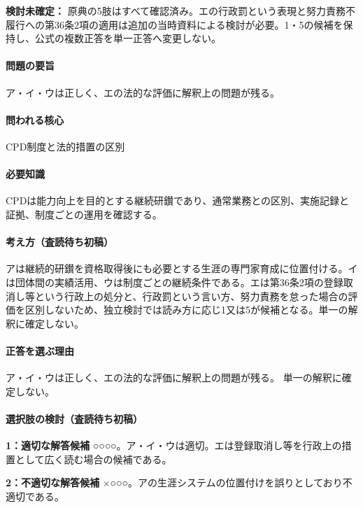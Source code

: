 \par\textbf{検討未確定：} 原典の5肢はすべて確認済み。エの行政罰という表現と努力責務不履行への第36条2項の適用は追加の当時資料による検討が必要。1・5の候補を保持し、公式の複数正答を単一正答へ変更しない。

\paragraph{問題の要旨} ア・イ・ウは正しく、エの法的な評価に解釈上の問題が残る。

\paragraph{問われる核心} CPD制度と法的措置の区別

\paragraph{必要知識} CPDは能力向上を目的とする継続研鑚であり、通常業務との区別、実施記録と証拠、制度ごとの運用を確認する。

\paragraph{考え方（査読待ち初稿）} アは継続的研鑚を資格取得後にも必要とする生涯の専門家育成に位置付ける。イは団体間の実績活用、ウは制度ごとの継続条件である。エは第36条2項の登録取消し等という行政上の処分と、行政罰という言い方、努力責務を怠った場合の評価を区別しないため、独立検討では読み方に応じ1又は5が候補となる。単一の解釈に確定しない。

\paragraph{正答を選ぶ理由} ア・イ・ウは正しく、エの法的な評価に解釈上の問題が残る。 単一の解釈に確定しない。

\paragraph{選択肢の検討（査読待ち初稿）}\mbox{}\par

\noindent\textbf{1：適切な解答候補} ○○○○。ア・イ・ウは適切。エは登録取消し等を行政上の措置として広く読む場合の候補である。\par

\noindent\textbf{2：不適切な解答候補} ×○○○。アの生涯システムの位置付けを誤りとしており不適切である。\par

